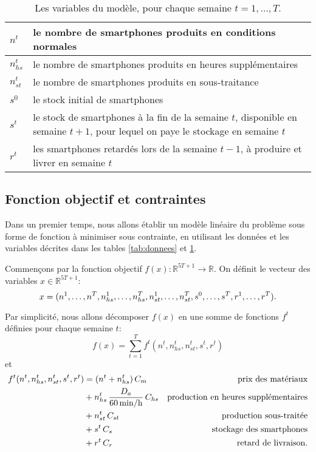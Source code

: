 \begin{table}\label{tab:variables}
    \centering
    \begin{tabular}{|>{\centering}p{1cm}|m{12cm}|}
        \hline
        $n^t$ & le nombre de smartphones produits en conditions normales \\
        \hline
        $n_{hs}^t$ & le nombre de smartphones produits en heures supplémentaires \\
        \hline
        $n_{st}^t$ & le nombre de smartphones produits en sous-traitance \\
        \hline
        $s^0$ & le stock initial de smartphones \\
        \hline
        $s^t$ & le stock de smartphones à la fin de la semaine $t$, disponible en semaine $t+1$, pour lequel on paye le stockage en semaine $t$ \\
        \hline
        $r^t$ & les smartphones retardés lors de la semaine $t-1$, à produire et livrer en semaine $t$ \\
        \hline
    \end{tabular}
    \caption{Les variables du modèle, pour chaque semaine $t = 1,\dots,T$.}
\end{table}
%
%

\subsection{Fonction objectif et contraintes}

Dans un premier temps, nous allons établir un modèle linéaire du problème sous forme de fonction à minimiser sous contrainte, en utilisant les données et les variables décrites dans les tables \ref{tab:donnees} et \ref{tab:variables}.

Commençons par la fonction objectif
$f(x) : \mathbb{R}^{5T+1} \rightarrow \mathbb{R}$.
On définit le vecteur des variables $x \in \mathbb{R}^{5T+1}$:
\[
    x = (n^1,\dots,n^T,n_{hs}^1,\dots,n_{hs}^T,n_{st}^1,\dots,n_{st}^T,s^0,\dots,s^T,r^1,\dots,r^T)
    \text.
\]

Par simplicité, nous allons décomposer $f(x)$ en une somme de fonctions $f^t$ définies pour chaque semaine $t$:
\[
    f(x) = \sum_{t=1}^{T} f^t(n^t, n_{hs}^t, n_{st}^t, s^t, r^t)
\]
et
\begin{align*}
    f^t(n^t, n_{hs}^t, n_{st}^t, s^t, r^t)
    &= (n^t + n_{hs}^t)\,C_m 
    & \text{prix des matériaux}\\
    &+ n_{hs}^t\,\frac{D_a}{60 \,\mathrm{min/h}}\,C_{hs}
    & \text{production en heures supplémentaires}\\
    &+ n_{st}^t\,C_{st}
    & \text{production sous-traitée}\\
    &+ s^t\,C_s
    & \text{stockage des smartphones}\\
    &+ r^t\,C_r
    & \text{retard de livraison}
    \text.
\end{align*}

